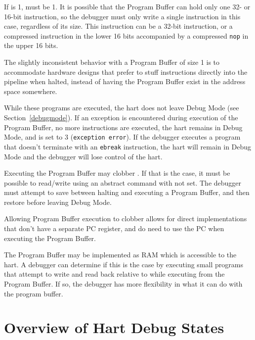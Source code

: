 If \FdmAbstractcsProgbufsize is 1, \FdmDmstatusImpebreak must be 1. It is possible that the Program
Buffer can hold only one 32- or 16-bit instruction, so the debugger must only
write a single instruction in this case, regardless of its size.
This instruction can be a 32-bit
instruction, or a compressed instruction in the lower 16 bits accompanied by a
compressed {\tt nop} in the upper 16 bits.

\begin{commentary}
    The slightly inconsistent behavior with a Program Buffer of size 1 is to
    accommodate hardware designs that prefer to stuff instructions directly
    into the pipeline when halted, instead of having the Program Buffer exist
    in the address space somewhere.
\end{commentary}

While these programs are executed, the hart does not leave Debug Mode (see
Section~\ref{debugmode}).  If an exception is encountered during execution of
the Program Buffer, no more instructions are executed, the hart remains in Debug
Mode, and \FdmAbstractcsCmderr is set to 3 ({\tt exception error}).  If the debugger
executes a program that doesn't terminate with an {\tt ebreak} instruction, the
hart will remain in Debug Mode and the debugger will lose control of the hart.

Executing the Program Buffer may clobber \RcsrDpc. If that is the case, it must be
possible to read/write \RcsrDpc using an abstract command with \FacAccessregisterPostexec not set.
The debugger must attempt to save \RcsrDpc between halting and
executing a Program Buffer, and then restore \RcsrDpc before leaving Debug Mode.

\begin{commentary}
    Allowing Program Buffer execution to clobber \RcsrDpc allows for direct
    implementations that don't have a separate PC register, and do need to use
    the PC when executing the Program Buffer.
\end{commentary}

The Program Buffer may be implemented as RAM which is accessible to the
hart. A debugger can determine if this is the case by executing small
programs that attempt to write and read back relative to \Rpc while executing
from the Program Buffer.
If so, the debugger has more flexibility in what it can do with the program buffer.

\section{Overview of Hart Debug States}

